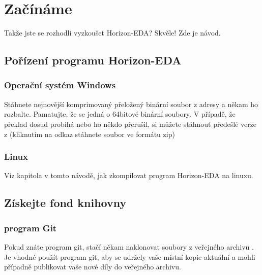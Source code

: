 \documentclass[letterpaper,10pt,czech]{sphinxmanual}
\begin{document}
\chapter{Začínáme}
\label{\detokenize{getting-started_cz:zaciname}}\label{\detokenize{getting-started_cz::doc}}
Takže jste se rozhodli vyzkoušet Horizon-EDA? Skvěle! Zde je návod.


\section{Pořízení programu Horizon-EDA}
\label{\detokenize{getting-started_cz:porizeni-programu-horizon-eda}}

\subsection{Operační systém Windows}
\label{\detokenize{getting-started_cz:operacni-system-windows}}
Stáhnete nejnovější komprimovaný přeložený binární soubor z adresy 
a někam ho rozbalte. Pamatujte, že se jedná o 64bitové binární soubory. V případě, že překlad dosud probíhá  nebo ho někdo přerušil, si můžete stáhnout předešlé verze z
(kliknutím na odkaz stáhnete soubor ve formátu zip)


\subsection{Linux}
\label{\detokenize{getting-started_cz:linux}}
Viz kapitola
{\hyperref[\detokenize{build-linux_cz::doc}]{}} v tomto návodě, jak zkompilovat program Horizon-EDA na linuxu.


\section{Získejte fond knihovny}
\label{\detokenize{getting-started_cz:ziskejte-fond-knihovny}}

\subsection{program Git}
\label{\detokenize{getting-started_cz:program-git}}
Pokud znáte program git, stačí někam naklonovat soubory z veřejného archivu
. Je vhodné použít program git, aby se udržely vaše místní
kopie aktuální a mohli případně publikovat vaše nové díly do veřejného archivu.
\end{document}
